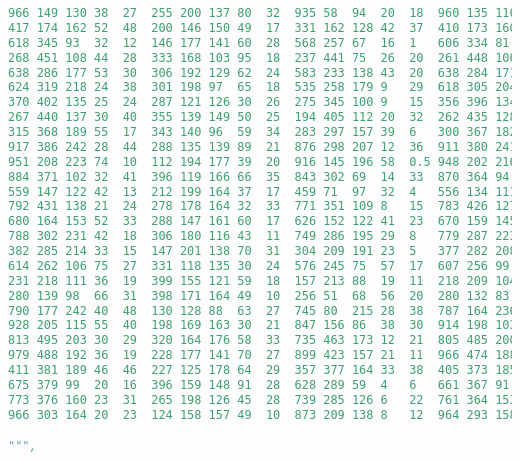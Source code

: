 \begin{lstlisting}[language=Python]
966	149	130	38	27	255	200	137	80	32	935	58	94	20	18	960	135	116	23	24
417	174	162	52	48	200	146	150	49	17	331	162	128	42	37	410	173	160	52	39
618	345	93	32	12	146	177	141	60	28	568	257	67	16	1	606	334	81	19	2
268	451	108	44	28	333	168	103	95	18	237	441	75	26	20	261	448	106	32	16
638	286	177	53	30	306	192	129	62	24	583	233	138	43	20	638	284	171	39	26
624	319	218	24	38	301	198	97	65	18	535	258	179	9	29	618	305	204	12	36
370	402	135	25	24	287	121	126	30	26	275	345	100	9	15	356	396	134	19	20
267	440	137	30	40	355	139	149	50	25	194	405	112	20	32	262	435	128	28	36
315	368	189	55	17	343	140	96	59	34	283	297	157	39	6	300	367	182	44	5
917	386	242	28	44	288	135	139	89	21	876	298	207	12	36	911	380	241	20	41
951	208	223	74	10	112	194	177	39	20	916	145	196	58	0.5	948	202	216	72	8
884	371	102	32	41	396	119	166	66	35	843	302	69	14	33	870	364	94	26	32
559	147	122	42	13	212	199	164	37	17	459	71	97	32	4	556	134	111	39	0
792	431	138	21	24	278	178	164	32	33	771	351	109	8	15	783	426	127	11	23
680	164	153	52	33	288	147	161	60	17	626	152	122	41	23	670	159	145	46	22
788	302	231	42	18	306	180	116	43	11	749	286	195	29	8	779	287	223	34	9
382	285	214	33	15	147	201	138	70	31	304	209	191	23	5	377	282	208	30	0
614	262	106	75	27	331	118	135	30	24	576	245	75	57	17	607	256	99	66	17
231	218	111	36	19	399	155	121	59	18	157	213	88	19	11	218	209	104	25	16
280	139	98	66	31	398	171	164	49	10	256	51	68	56	20	280	132	83	62	19
790	177	242	40	48	130	128	88	63	27	745	80	215	28	38	787	164	236	35	42
928	205	115	55	40	198	169	163	30	21	847	156	86	38	30	914	198	103	46	26
813	495	203	30	29	320	164	176	58	33	735	463	173	12	21	805	485	200	18	29
979	488	192	36	19	228	177	141	70	27	899	423	157	21	11	966	474	188	27	4
411	381	189	46	46	227	125	178	64	29	357	377	164	33	38	405	373	185	32	31
675	379	99	20	16	396	159	148	91	28	628	289	59	4	6	661	367	91	19	12
773	376	160	23	31	265	198	126	45	28	739	285	126	6	22	761	364	153	9	25
966	303	164	20	23	124	158	157	49	10	873	209	138	8	12	964	293	158	11	22

""",


\end{lstlisting}
